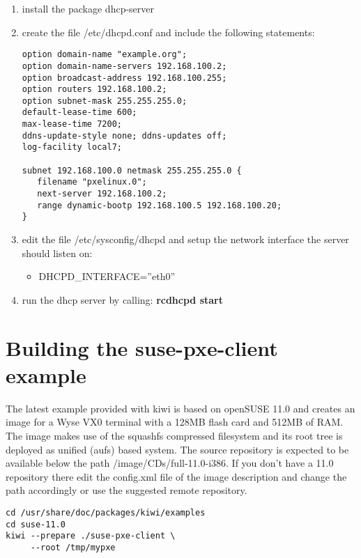 \begin{enumerate}
\item install the package dhcp-server
\item create the file /etc/dhcpd.conf and include the following
      statements:
 
      \begin{verbatim}
option domain-name "example.org";
option domain-name-servers 192.168.100.2;
option broadcast-address 192.168.100.255;
option routers 192.168.100.2;
option subnet-mask 255.255.255.0;
default-lease-time 600;
max-lease-time 7200;
ddns-update-style none; ddns-updates off;
log-facility local7;

subnet 192.168.100.0 netmask 255.255.255.0 {
   filename "pxelinux.0";
   next-server 192.168.100.2;
   range dynamic-bootp 192.168.100.5 192.168.100.20;
}
\end{verbatim}

\item edit the file /etc/sysconfig/dhcpd and setup the network
      interface the server should listen on:
      \begin{itemize}
      \item DHCPD\_INTERFACE=''eth0''
      \end{itemize}
\item run the dhcp server by calling:
      \textbf{rcdhcpd start}
\end{enumerate}

\section{Building the suse-pxe-client example}

The latest example provided with kiwi is based on openSUSE 11.0 and creates an
image for a Wyse VX0 terminal with a 128MB flash card and 512MB of RAM.
The image makes use of the squashfs compressed filesystem and its
root tree is deployed as unified (aufs) based system. 
The source repository is expected to be available below the path
/image/CDs/full-11.0-i386. If you don't have a 11.0 repository there
edit the config.xml file of the image description and change the
path accordingly or use the suggested remote repository.

\begin{Command}{12cm}
\begin{verbatim}
cd /usr/share/doc/packages/kiwi/examples
cd suse-11.0
kiwi --prepare ./suse-pxe-client \
     --root /tmp/mypxe
\end{verbatim}
\end{Command}

